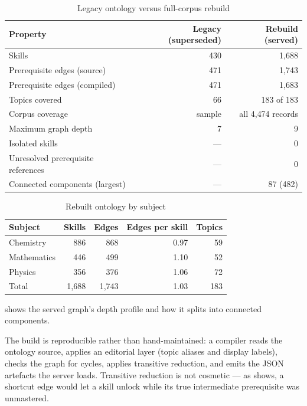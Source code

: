 \begin{table}[htbp]
  \centering
  \caption{Legacy ontology versus full-corpus rebuild}
  \label{tab:ontology-compare}
  \begin{tabular}{lrr}
    \toprule
    Property & Legacy (superseded) & Rebuild (served) \\
    \midrule
    Skills & 430 & 1{,}688 \\
    Prerequisite edges (source) & 471 & 1{,}743 \\
    Prerequisite edges (compiled) & 471 & 1{,}683 \\
    Topics covered & 66 & 183 of 183 \\
    Corpus coverage & sample & all 4{,}474 records \\
    Maximum graph depth & 7 & 9 \\
    Isolated skills & --- & 0 \\
    Unresolved prerequisite references & --- & 0 \\
    Connected components (largest) & --- & 87 (482) \\
    \bottomrule
  \end{tabular}
\end{table}

\begin{table}[htbp]
  \centering
  \caption{Rebuilt ontology by subject}
  \label{tab:ontology-subject}
  \begin{tabular}{lrrrr}
    \toprule
    Subject & Skills & Edges & Edges per skill & Topics \\
    \midrule
    Chemistry   & 886 & 868 & 0.97 & 59 \\
    Mathematics & 446 & 499 & 1.10 & 52 \\
    Physics     & 356 & 376 & 1.06 & 72 \\
    \midrule
    Total       & 1{,}688 & 1{,}743 & 1.03 & 183 \\
    \bottomrule
  \end{tabular}
\end{table}

 shows the served graph's depth profile and how it
splits into connected components.



The build is reproducible rather than hand-maintained: a compiler reads the
ontology source, applies an editorial layer (topic aliases and display labels),
checks the graph for cycles, applies transitive reduction, and emits the JSON
artefacts the server loads. Transitive reduction is not cosmetic --- as
 shows, a shortcut edge would let a skill unlock while its true
intermediate prerequisite was unmastered.

